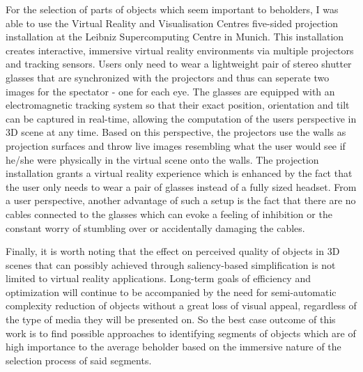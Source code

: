 For the selection of parts of objects which seem important to beholders, I was able to use the Virtual Reality and Visualisation Centres five-sided projection installation at the Leibniz Supercomputing Centre in Munich. This installation creates interactive, immersive virtual reality environments via multiple projectors and tracking sensors. Users only need to wear a lightweight pair of stereo shutter glasses that are synchronized with the projectors and thus can seperate two images for the spectator - one for each eye. The glasses are equipped with an electromagnetic tracking system so that their exact position, orientation and tilt can be captured in real-time, allowing the computation of the users perspective in 3D scene at any time. Based on this perspective, the projectors use the walls as projection surfaces and throw live images resembling what the user would see if he/she were physically in the virtual scene onto the walls. The projection installation grants a virtual reality experience which is enhanced by the fact that the user only needs to wear a pair of glasses instead of a fully sized headset. From a user perspective, another advantage of such a setup is the fact that there are no cables connected to the glasses which can evoke a feeling of inhibition or the constant worry of stumbling over or accidentally damaging the cables.


Finally, it is worth noting that the effect on perceived quality of objects in 3D scenes that can possibly achieved through saliency-based simplification is not limited to virtual reality applications. Long-term goals of efficiency and optimization will continue to be accompanied by the need for semi-automatic complexity reduction of objects without a great loss of visual appeal, regardless of the type of media they will be presented on. So the best case outcome of this work is to find possible approaches to identifying segments of objects which are of high importance to the average beholder based on the immersive nature of the selection process of said segments.

